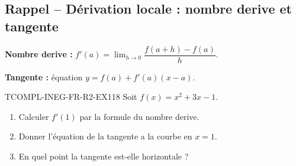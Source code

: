 

\subsection*{Rappel -- Dérivation locale : nombre derive et tangente}

\textbf{Nombre derive :} $f'(a) = \lim_{h \to 0} \dfrac{f(a+h) - f(a)}{h}$.

\textbf{Tangente :} équation $y = f(a) + f'(a)(x - a)$.

\begin{exercice}{TCOMPL-INEG-FR-R2-EX1}{1}{8}
Soit $f(x) = x^2 + 3x - 1$.
\begin{enumerate}
  \item Calculer $f'(1)$ par la formule du nombre derive.
  \item Donner l'équation de la tangente a la courbe en $x = 1$.
  \item En quel point la tangente est-elle horizontale ?
\end{enumerate}
\end{exercice}

